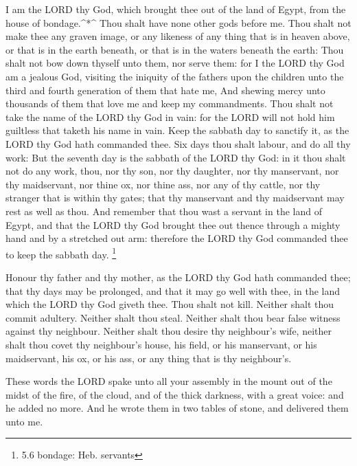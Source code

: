  I am the LORD thy God, which brought thee out of the land
of Egypt, from the house of bondage.\^{}*\^{}  Thou shalt
have none other gods before me.  Thou shalt not make thee
any graven image, or any likeness of any thing that is in heaven above,
or that is in the earth beneath, or that is in the waters beneath the
earth:  Thou shalt not bow down thyself unto them, nor serve
them: for I the LORD thy God am a jealous God, visiting the iniquity of
the fathers upon the children unto the third and fourth generation of
them that hate me,  And shewing mercy unto thousands of
them that love me and keep my commandments.  Thou shalt not
take the name of the LORD thy God in vain: for the LORD will not hold
him guiltless that taketh his name in vain.  Keep the
sabbath day to sanctify it, as the LORD thy God hath commanded thee.
 Six days thou shalt labour, and do all thy work:
 But the seventh day is the sabbath of the LORD thy God: in
it thou shalt not do any work, thou, nor thy son, nor thy daughter, nor
thy manservant, nor thy maidservant, nor thine ox, nor thine ass, nor
any of thy cattle, nor thy stranger that is within thy gates; that thy
manservant and thy maidservant may rest as well as thou. 
And remember that thou wast a servant in the land of Egypt, and that the
LORD thy God brought thee out thence through a mighty hand and by a
stretched out arm: therefore the LORD thy God commanded thee to keep the
sabbath day. \footnote{5.6 bondage: Heb. servants}

 Honour thy father and thy mother, as the LORD thy God hath
commanded thee; that thy days may be prolonged, and that it may go well
with thee, in the land which the LORD thy God giveth thee. 
Thou shalt not kill.  Neither shalt thou commit adultery.
 Neither shalt thou steal.  Neither shalt thou
bear false witness against thy neighbour.  Neither shalt
thou desire thy neighbour's wife, neither shalt thou covet thy
neighbour's house, his field, or his manservant, or his maidservant, his
ox, or his ass, or any thing that is thy neighbour's.

 These words the LORD spake unto all your assembly in the
mount out of the midst of the fire, of the cloud, and of the thick
darkness, with a great voice: and he added no more. And he wrote them in
two tables of stone, and delivered them unto me.

